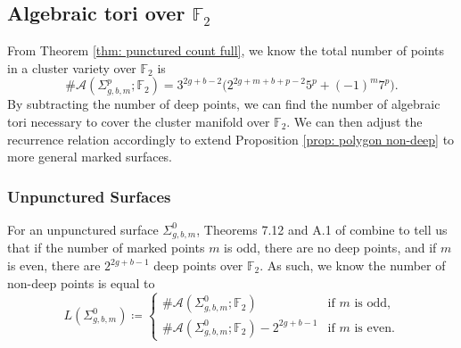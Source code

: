 \documentclass[reqno,12pt]{amsart}
\theoremstyle{definition}
\theoremstyle{remark}
\theoremstyle{remark}
\numberwithin{equation}{section}
\begin{document}
\subsection{Algebraic tori over \texorpdfstring{$\mathbb{F}_2$}{F2}}

 From Theorem \ref{thm: punctured count full}, we know the total number of points in a cluster variety over $\mathbb{F}_2$ is 
\[ \#\mathcal{A}(\Sigma_{g,b,m}^p; \mathbb{F}_2) = 3^{2g+b-2} \big( 2^{2g+m+b+p-2} 5^p + (-1)^m 7^p \big). \]
By subtracting the number of deep points, we can find the number of algebraic tori necessary to cover the cluster manifold over $\mathbb{F}_2$. We can then adjust the recurrence relation accordingly to extend Proposition \ref{prop: polygon non-deep} to more general marked surfaces.

\subsubsection{Unpunctured Surfaces}

For an unpunctured surface $\Sigma_{g,b,m}^0$, Theorems 7.12 and A.1 of \cite{BM25} combine to tell us that if the number of marked points $m$ is odd, there are no deep points, and if $m$ is even, there are $2^{2g+b-1}$ deep points over $\mathbb{F}_2$. As such, we know the number of non-deep points is equal to 
\begin{displaymath}
	L(\Sigma_{g,b,m}^0) \coloneqq 
	\begin{cases}
		\#\mathcal{A}(\Sigma_{g,b,m}^0; \mathbb{F}_2) & \text{if $m$ is odd,} \\
		\#\mathcal{A}(\Sigma_{g,b,m}^0; \mathbb{F}_2) - 2^{2g+b-1} & \text{if $m$ is even.}
	\end{cases}
\end{displaymath}
\end{document}
